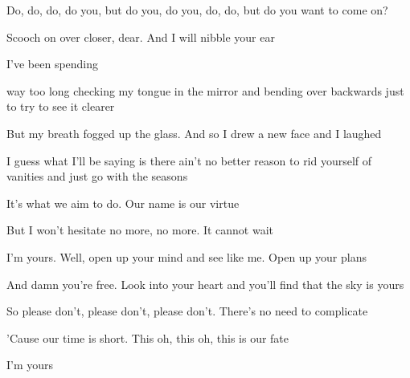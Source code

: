 \begin{song}
\bigskip

 Do, do, do, do you,  but do you, do you, do, do, but do you want to come on?  \par
Scooch on over closer, dear. And I will nibble your ear \par

\bigskip

      \par


\bigskip

I've been spending \par
{}way too long checking my tongue in the mirror and bending over backwards just to try to see it clearer \par
But my breath fogged up the glass. And so I drew a new face and I laughed \par
I guess what I'll be saying is there ain't no better reason to rid yourself of vanities and just go with the seasons \par
It's what we aim to do. Our name is our virtue \par

\bigskip

But I won't hesitate no more, no more. It cannot wait \par

\bigskip

I'm yours. Well, open up your mind and see like me. Open up your plans \par
And damn you're free. Look into your heart and you'll find that  the sky is yours \par
So please don't, please don't, please don't. There's no need to complicate \par
'Cause our time is short. This oh, this oh, this is our fate \par
I'm yours \par

\end{song}